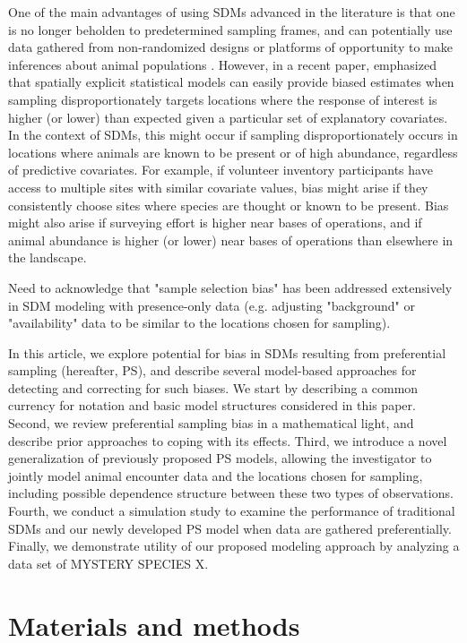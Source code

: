 \documentclass[times,mee,doublespace,]{besauth2}
\begin{document}
One of the main advantages of using SDMs advanced in the literature is that one is no longer beholden to predetermined sampling frames, and can potentially use data gathered from non-randomized designs or platforms of opportunity to make inferences about animal populations \citep{JohnsonEtAl2010}.  However,
in a recent paper, \citet{DiggleEtAl2010} emphasized that spatially explicit statistical models can easily provide biased estimates when sampling disproportionately targets locations where the response of interest is higher (or lower) than expected given a particular set of explanatory covariates.  In the context of SDMs, this might occur if sampling disproportionately occurs in locations where animals are known to be present or of high abundance, regardless of predictive covariates. For example, if volunteer inventory participants have access to multiple sites with similar covariate values, bias might arise if they consistently choose sites where species are thought or known to be present.  Bias might also arise if surveying effort is higher near bases of operations, and if animal abundance is higher (or lower) near bases of operations than elsewhere in the landscape.

Need to acknowledge that "sample selection bias" has been addressed extensively in SDM modeling with presence-only data (e.g. adjusting "background" or "availability" data to be similar to the locations chosen for sampling).

In this article, we explore potential for bias in SDMs resulting from preferential sampling (hereafter, PS), and describe several model-based approaches for detecting and correcting for such biases.  We start by describing a common currency for notation and basic model structures considered in this paper.  Second, we review preferential sampling bias in a mathematical light, and describe prior approaches to coping with its effects. Third, we introduce a novel generalization of previously proposed PS models, allowing the investigator to jointly model animal encounter data and the locations chosen for sampling, including possible dependence structure between these two types of observations.  Fourth, we conduct a simulation study to examine the performance of traditional SDMs and our newly developed PS model when data are gathered preferentially.  Finally, we demonstrate utility of our proposed modeling approach by analyzing a data set of MYSTERY SPECIES X.


\section{Materials and methods}
\end{document}
